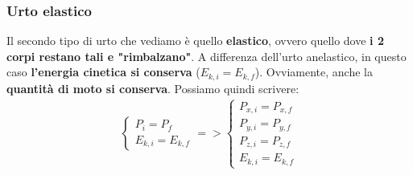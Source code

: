         \subsubsection{Urto elastico}
            Il secondo tipo di urto che vediamo è quello \textbf{elastico}, ovvero quello dove \textbf{i 2 corpi restano tali e "rimbalzano"}. A differenza dell'urto anelastico, in questo caso \textbf{l'energia cinetica si conserva} ($E_{k, i} = E_{k, f}$). Ovviamente, anche la \textbf{quantità di moto si conserva}. Possiamo quindi scrivere:
            \begin{align*}
                \begin{cases}
                    P_i=P_f\\
                    E_{k, i}=E_{k, f}
                \end{cases}=>
                \begin{cases}
                    P_{x, i}=P_{x, f}\\
                    P_{y, i}=P_{y, f}\\
                    P_{z, i}=P_{z, f}\\
                    E_{k, i}=E_{k, f}
                \end{cases}
            \end{align*}
